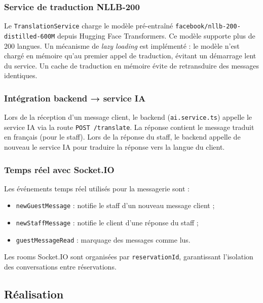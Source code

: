 \subsubsection{Service de traduction NLLB-200}

Le \texttt{TranslationService} charge le modèle pré-entraîné \texttt{facebook/nllb-200-distilled-600M} depuis Hugging Face Transformers. Ce modèle supporte plus de 200 langues. Un mécanisme de \textit{lazy loading} est implémenté : le modèle n'est chargé en mémoire qu'au premier appel de traduction, évitant un démarrage lent du service. Un cache de traduction en mémoire évite de retransduire des messages identiques.

\subsubsection{Intégration backend → service IA}

Lors de la réception d'un message client, le backend (\texttt{ai.service.ts}) appelle le service IA via la route \texttt{POST /translate}. La réponse contient le message traduit en français (pour le staff). Lors de la réponse du staff, le backend appelle de nouveau le service IA pour traduire la réponse vers la langue du client.

\subsubsection{Temps réel avec Socket.IO}

Les événements temps réel utilisés pour la messagerie sont :
\begin{itemize}
  \item \texttt{newGuestMessage} : notifie le staff d'un nouveau message client ;
  \item \texttt{newStaffMessage} : notifie le client d'une réponse du staff ;
  \item \texttt{guestMessageRead} : marquage des messages comme lus.
\end{itemize}

Les rooms Socket.IO sont organisées par \texttt{reservationId}, garantissant l'isolation des conversations entre réservations.

\subsection{Réalisation}


